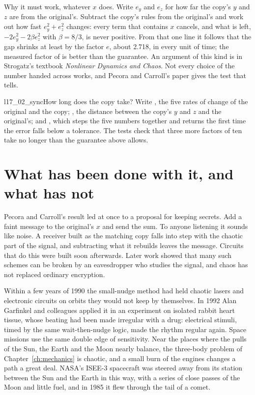 \begin{rigourbox}
Why it must work, whatever $x$ does. Write $e_y$ and $e_z$ for how far the
copy's $y$ and $z$ are from the original's. Subtract the copy's rules from the
original's and work out how fast $e_y^2 + e_z^2$ changes: every term that
contains $x$ cancels, and what is left, $-2e_y^2 - 2\beta e_z^2$ with
$\beta = 8/3$, is never positive. From that one line it follows that the gap
shrinks at least by the factor $e$, about \num{2.718}, in every unit of time;
the measured factor of  is better than the guarantee.
An argument of this kind is in Strogatz's textbook \emph{Nonlinear Dynamics
and Chaos}. Not every choice of the number handed across works, and Pecora
and Carroll's paper gives the test that tells.
\end{rigourbox}

\begin{lab}{l17_02_sync}{How long does the copy take?}
Write , the five rates of change of the original and the
copy; , the distance between the copy's $y$ and $z$ and the
original's; and , which steps the five numbers together and
returns the first time the error falls below a tolerance. The tests check
that three more factors of ten take no longer than the guarantee above
allows.
\end{lab}

\section{What has been done with it, and what has not}
\label{sec:ch17-world}

\noindent
Pecora and Carroll's result led at once to a proposal for keeping secrets.
Add a faint message to the original's $x$ and send the sum. To anyone
listening it sounds like noise. A receiver built as the matching copy falls
into step with the chaotic part of the signal, and subtracting what it
rebuilds leaves the message. Circuits that do this were built soon afterwards.
Later work showed that many such schemes can be broken by an eavesdropper who
studies the signal, and chaos has not replaced ordinary encryption.

\begin{worldbox}
Within a few years of 1990 the small-nudge method had held chaotic lasers and
electronic circuits on orbits they would not keep by themselves. In 1992 Alan
Garfinkel and colleagues applied it in an experiment on isolated rabbit heart
tissue, whose beating had been made irregular with a drug: electrical stimuli,
timed by the same wait-then-nudge logic, made the rhythm regular again. Space
missions use the same double edge of sensitivity. Near the places where the
pulls of the Sun, the Earth and the Moon nearly balance, the three-body
problem of Chapter~\ref{ch:mechanics} is chaotic, and a small burn of the
engines changes a path a great deal. NASA's ISEE-3 spacecraft was steered
away from its station between the Sun and the Earth in this way, with a
series of close passes of the Moon and little fuel, and in 1985 it flew
through the tail of a comet.
\end{worldbox}

